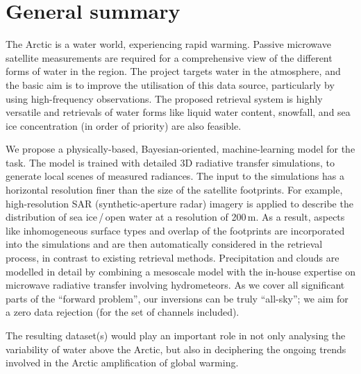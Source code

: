 \documentclass[12pt,oneside,a4paper]{article}
\begin{document}
	
	
	\thispagestyle{empty}
	\vspace*{-10mm}
	\noindent
	\textbf{\Large \LongTitle}




\section{General summary}
%
The Arctic is a water world, experiencing rapid warming. Passive microwave
satellite measurements are required for a comprehensive view of the different forms of water in the region. The project targets water in the atmosphere, and the basic aim is to improve the utilisation of this data source, particularly by using high-frequency observations. The proposed retrieval system is highly versatile and retrievals of water forms like liquid water content, snowfall, and sea ice concentration (in order of priority) are also feasible.

We propose a physically-based, Bayesian-oriented, machine-learning model for
the task. The model is trained with detailed 3D radiative transfer simulations,
to generate local scenes of measured radiances. The input to the simulations
has a horizontal resolution finer than the size of the satellite footprints.
For example, high-resolution SAR (synthetic-aperture radar) imagery is applied
to describe the distribution of sea ice\,/\,open water at a resolution of
200\,m. As a result, aspects like inhomogeneous surface types and overlap of
the footprints are incorporated into the simulations and are then automatically
considered in the retrieval process, in contrast to existing retrieval methods.
Precipitation and clouds are modelled in detail by combining a mesoscale model
with the in-house expertise on microwave radiative transfer involving
hydrometeors. As we cover all significant parts of the ``forward problem'', our
inversions can be truly ``all-sky''; we aim for a zero data rejection (for the
set of channels included).

The resulting dataset(s) would play an important role in not only analysing the
variability of water above the Arctic, but also in deciphering the
ongoing trends involved in the Arctic amplification of global warming.
\end{document}
